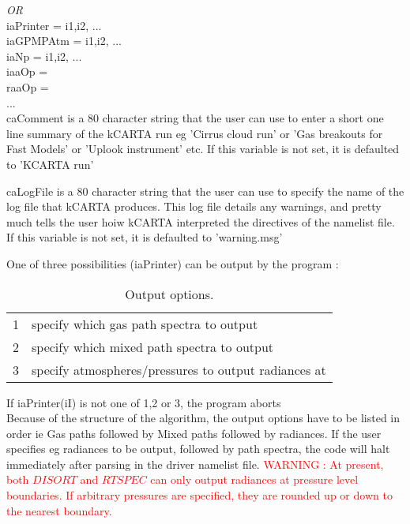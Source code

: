 \documentclass[12pt]{article}
\newcommand{\kc}{\textsf{kCARTA}\xspace}
\newcommand{\ttab}{\indent\indent}
\begin{document}
{{{\em OR}\\

\ttab iaPrinter          = i1,i2, ...\\
\ttab \indent iaGPMPAtm  = i1,i2, ...\\
\ttab \indent iaNp       = i1,i2, ...\\
\ttab \indent iaaOp   = \\
\ttab \indent raaOp   = \\
\ttab ...\\

\medskip
\noindent caComment is a 80 character string that the user can use to 
enter a short one line summary of the kCARTA run eg 'Cirrus cloud run' or
'Gas breakouts for Fast Models' or 'Uplook instrument' etc. If this variable
is not set, it is defaulted to 'KCARTA run'

\medskip
\noindent caLogFile is a 80 character string that the user can use to 
specify the name of the log file that kCARTA produces. This log file details
any warnings, and pretty much tells the user hoiw \kc interpreted the 
directives of the namelist file. If this variable is not set, it is 
defaulted to 'warning.msg'

\noindent One of three possibilities (iaPrinter) can be output by the 
program :
{\sf 
\begin{small}
\begin{longtable}{cl}
\caption{Output options.}\\
1 & specify which gas path spectra to output\\
2 & specify which mixed path spectra to output\\
3 & specify atmospheres/pressures to output radiances at\\
\end{longtable}
\end{small}
}

\medskip
\noindent If iaPrinter(iI) is not one of 1,2 or 3, the program aborts\\

Because of the structure of the algorithm, the output options have to be 
listed in order ie Gas paths followed by Mixed paths followed by radiances. 
If the user specifies eg radiances to be output, followed by path spectra, 
the code will halt immediately after parsing in the driver namelist file.
\textcolor{red} 
{WARNING : At present, both $DISORT$ and $RTSPEC$ can only output radiances
at pressure level boundaries. If arbitrary pressures are specified, they are 
rounded up or down to the nearest boundary.}

}}
\end{document}
